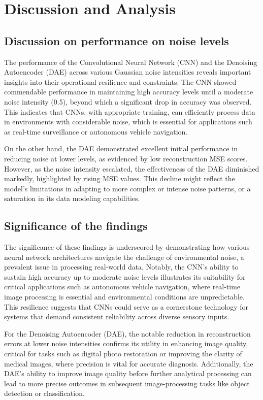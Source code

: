 \chapter{Discussion and Analysis}
\label{ch:evaluation}

\section{Discussion on performance on noise levels}
The performance of the Convolutional Neural Network (CNN) and the Denoising Autoencoder (DAE) across various Gaussian noise intensities reveals important insights into their operational resilience and constraints. The CNN showed commendable performance in maintaining high accuracy levels until a moderate noise intensity (0.5), beyond which a significant drop in accuracy was observed. This indicates that CNNs, with appropriate training, can efficiently process data in environments with considerable noise, which is essential for applications such as real-time surveillance or autonomous vehicle navigation.

On the other hand, the DAE demonstrated excellent initial performance in reducing noise at lower levels, as evidenced by low reconstruction MSE scores. However, as the noise intensity escalated, the effectiveness of the DAE diminished markedly, highlighted by rising MSE values. This decline might reflect the model's limitations in adapting to more complex or intense noise patterns, or a saturation in its data modeling capabilities.

\section{Significance of the findings}
The significance of these findings is underscored by demonstrating how various neural network architectures navigate the challenge of environmental noise, a prevalent issue in processing real-world data. Notably, the CNN's ability to sustain high accuracy up to moderate noise levels illustrates its suitability for critical applications such as autonomous vehicle navigation, where real-time image processing is essential and environmental conditions are unpredictable. This resilience suggests that CNNs could serve as a cornerstone technology for systems that demand consistent reliability across diverse sensory inputs.

For the Denoising Autoencoder (DAE), the notable reduction in reconstruction errors at lower noise intensities confirms its utility in enhancing image quality, critical for tasks such as digital photo restoration or improving the clarity of medical images, where precision is vital for accurate diagnosis. Additionally, the DAE’s ability to improve image quality before further analytical processing can lead to more precise outcomes in subsequent image-processing tasks like object detection or classification.

